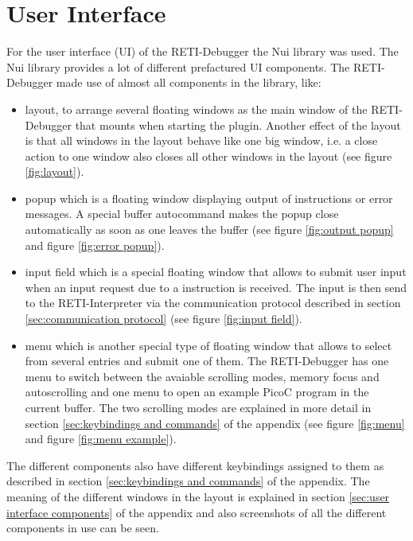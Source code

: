 \documentclass{report}
\begin{document}
\section{User Interface}
\label{sec:user interface with nui}

For the user interface (\alert{UI}) of the RETI-Debugger the \alert{Nui library}\cite{tanjimMunifTanjimNuiNvim2024} was used. The Nui library provides a lot of different prefactured UI components. The RETI-Debugger made use of almost all components in the library, like:
\begin{itemize}
  \item \alert{layout}, to arrange several floating windows as the main window of the RETI-Debugger that mounts when starting the plugin. Another effect of the layout is that all windows in the layout behave like one big window, i.e. a close action to one window also closes all other windows in the layout (see figure \ref{fig:layout}).
  \item \alert{popup} which is a floating window displaying output of  instructions or error messages. A special buffer autocommand makes the popup close automatically as soon as one leaves the buffer (see figure \ref{fig:output popup} and figure \ref{fig:error popup}).
  \item \alert{input field} which is a special floating window that allows to submit user input when an input request due to a  instruction is received. The input is then send to the RETI-Interpreter via the communication protocol described in section \ref{sec:communication protocol} (see figure \ref{fig:input field}).
  \item \alert{menu} which is another special type of floating window that allows to select from several entries and submit one of them. The RETI-Debugger has one menu to switch between the avaiable \alert{scrolling modes}, \alert{memory focus} and \alert{autoscrolling} and one menu to open an example PicoC program in the current buffer. The two scrolling modes are explained in more detail in section \ref{sec:keybindings and commands} of the appendix (see figure \ref{fig:menu} and figure \ref{fig:menu example}).
\end{itemize}

The different components also have different keybindings assigned to them as described in section \ref{sec:keybindings and commands} of the appendix. The meaning of the different windows in the layout is explained in section \ref{sec:user interface components} of the appendix and also screenshots of all the different components in use can be seen.
\end{document}
